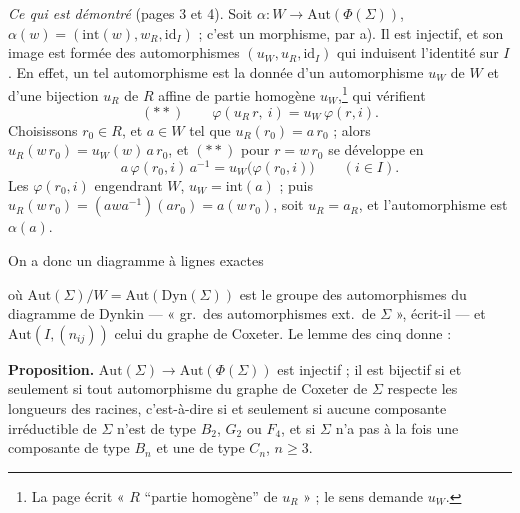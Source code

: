 \documentclass[11pt,a4paper]{article}
\begin{document}
\emph{Ce qui est démontré} (pages 3 et 4). Soit
$\alpha : W \to \mathrm{Aut}(\Phi(\Sigma))$, $\alpha(w) = (\mathrm{int}(w),
w_{R}, \mathrm{id}_{I})$ ; c'est un morphisme, par a). Il est injectif, et son
image est formée des automorphismes $(u_{W}, u_{R}, \mathrm{id}_{I})$ qui
induisent l'identité sur $I$. En effet, un tel automorphisme est la donnée d'un
automorphisme $u_{W}$ de $W$ et d'une bijection $u_{R}$ de $R$ affine de partie
homogène $u_{W}$,\footnote{La page écrit « $R$ “partie homogène” de $u_{R}$ » ;
le sens demande $u_{W}$.} qui vérifient
\[
  (\ast\ast) \qquad \varphi(u_{R}\,r,\ i) = u_{W}\,\varphi(r,i).
\]
Choisissons $r_{0} \in R$, et $a \in W$ tel que $u_{R}(r_{0}) = a\,r_{0}$ ;
alors $u_{R}(w\,r_{0}) = u_{W}(w)\,a\,r_{0}$, et $(\ast\ast)$ pour
$r = w\,r_{0}$ se développe en
\[
  a\,\varphi(r_{0}, i)\,a^{-1} = u_{W}\bigl(\varphi(r_{0}, i)\bigr)
  \qquad (i \in I).
\]
Les $\varphi(r_{0}, i)$ engendrant $W$, $u_{W} = \mathrm{int}(a)$ ; puis
$u_{R}(w\,r_{0}) = (awa^{-1})(ar_{0}) = a(w\,r_{0})$, soit $u_{R} = a_{R}$, et
l'automorphisme est $\alpha(a)$.

On a donc un diagramme à lignes exactes


où $\mathrm{Aut}(\Sigma)/W = \mathrm{Aut}(\mathrm{Dyn}(\Sigma))$ est le groupe
des automorphismes du diagramme de Dynkin --- « gr.\ des automorphismes ext.\
de $\Sigma$ », écrit-il --- et $\mathrm{Aut}(I, (n_{ij}))$ celui du graphe de
Coxeter. Le lemme des cinq donne :

\textbf{Proposition.} $\mathrm{Aut}(\Sigma) \to \mathrm{Aut}(\Phi(\Sigma))$ est
injectif ; il est bijectif si et seulement si tout automorphisme du graphe de
Coxeter de $\Sigma$ respecte les longueurs des racines, c'est-à-dire si et
seulement si aucune composante irréductible de $\Sigma$ n'est de type $B_{2}$,
$G_{2}$ ou $F_{4}$, et si $\Sigma$ n'a pas à la fois une composante de type
$B_{n}$ et une de type $C_{n}$, $n \geq 3$.
\end{document}

